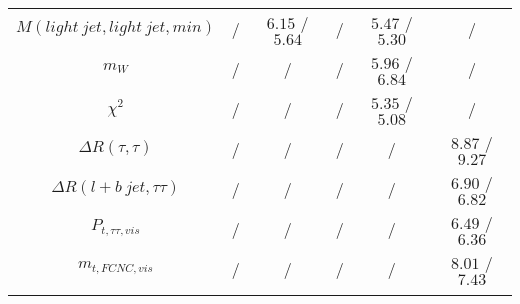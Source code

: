\begin{tabular}{cccccc}
$M(light~jet,light~jet,min)$ &  / & $6.15$ / $5.64$ &  / & $5.47$ / $5.30$ &  /\\
$m_{W}$ &  / &  / &  / & $5.96$ / $6.84$ &  /\\
$\chi^{2}$ &  / &  / &  / & $5.35$ / $5.08$ &  /\\
$\Delta R(\tau ,\tau )$ &  / &  / &  / &  / & $8.87$ / $9.27$\\
$\Delta R(l+b~jet,\tau \tau )$ &  / &  / &  / &  / & $6.90$ / $6.82$\\
$P_{t,\tau \tau ,vis}$ &  / &  / &  / &  / & $6.49$ / $6.36$\\
$m_{t,FCNC,vis}$ &  / &  / &  / &  / & $8.01$ / $7.43$\\
\bottomrule\bottomrule\\
\end{tabular}
